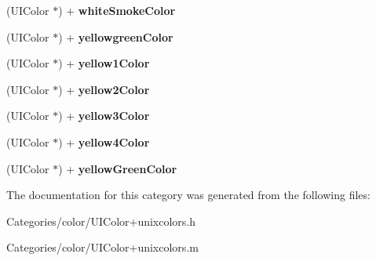 \begin{DoxyCompactItemize}
\item 
\hypertarget{category_u_i_color_07unixcolors_08_a5ac6495f4d05e1079660903270537640}{(U\-I\-Color $\ast$) + {\bfseries white\-Smoke\-Color}}\label{category_u_i_color_07unixcolors_08_a5ac6495f4d05e1079660903270537640}

\item 
\hypertarget{category_u_i_color_07unixcolors_08_a0444f8cd8941c755dd2eb7b5cd2070b7}{(U\-I\-Color $\ast$) + {\bfseries yellowgreen\-Color}}\label{category_u_i_color_07unixcolors_08_a0444f8cd8941c755dd2eb7b5cd2070b7}

\item 
\hypertarget{category_u_i_color_07unixcolors_08_ac4242839cab293ca0a2ecbf77d665418}{(U\-I\-Color $\ast$) + {\bfseries yellow1\-Color}}\label{category_u_i_color_07unixcolors_08_ac4242839cab293ca0a2ecbf77d665418}

\item 
\hypertarget{category_u_i_color_07unixcolors_08_a912eea366a0ff63d44bfbfb777f4a9e0}{(U\-I\-Color $\ast$) + {\bfseries yellow2\-Color}}\label{category_u_i_color_07unixcolors_08_a912eea366a0ff63d44bfbfb777f4a9e0}

\item 
\hypertarget{category_u_i_color_07unixcolors_08_a309873f72c60c96584bda8e7e8881e1d}{(U\-I\-Color $\ast$) + {\bfseries yellow3\-Color}}\label{category_u_i_color_07unixcolors_08_a309873f72c60c96584bda8e7e8881e1d}

\item 
\hypertarget{category_u_i_color_07unixcolors_08_ae817fd601ab2dc0a1048e19de05a9bb3}{(U\-I\-Color $\ast$) + {\bfseries yellow4\-Color}}\label{category_u_i_color_07unixcolors_08_ae817fd601ab2dc0a1048e19de05a9bb3}

\item 
\hypertarget{category_u_i_color_07unixcolors_08_ab3f322a2f76d6deef77a75355d7feabe}{(U\-I\-Color $\ast$) + {\bfseries yellow\-Green\-Color}}\label{category_u_i_color_07unixcolors_08_ab3f322a2f76d6deef77a75355d7feabe}

\end{DoxyCompactItemize}


The documentation for this category was generated from the following files\-:\begin{DoxyCompactItemize}
\item 
Categories/color/U\-I\-Color+unixcolors.\-h\item 
Categories/color/U\-I\-Color+unixcolors.\-m\end{DoxyCompactItemize}
